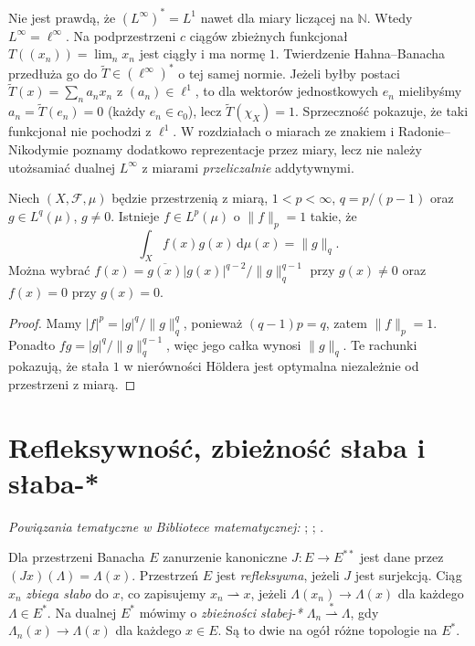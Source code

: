 \begin{uwaga}
Nie jest prawdą, że $(L^\infty)^*=L^1$ nawet dla
miary liczącej na $\mathbb N$. Wtedy $L^\infty=\ell^\infty$.
Na podprzestrzeni $c$ ciągów zbieżnych funkcjonał
$T((x_n))=\lim_nx_n$ jest ciągły i ma normę $1$.
Twierdzenie Hahna--Banacha przedłuża go do
$\widetilde T\in(\ell^\infty)^*$ o tej samej normie.
Jeżeli byłby postaci $\widetilde T(x)=\sum_n a_nx_n$
z $(a_n)\in\ell^1$, to dla wektorów jednostkowych $e_n$
mielibyśmy $a_n=\widetilde T(e_n)=0$ (każdy $e_n\in c_0$),
lecz $\widetilde T(\chi_X)=1$. Sprzeczność pokazuje,
że taki funkcjonał nie pochodzi z $\ell^1$.
W rozdziałach o miarach ze znakiem i Radonie--Nikodymie
poznamy dodatkowo reprezentacje przez miary, lecz nie
należy utożsamiać dualnej $L^\infty$ z miarami
\emph{przeliczalnie} addytywnymi.
\end{uwaga}

\begin{wniosek}
\label{cor:holder-sharp-15}
Niech $(X,\mathcal F,\mu)$ będzie przestrzenią z miarą,
$1<p<\infty$, $q=p/(p-1)$ oraz
$g\in L^q(\mu)$, $g\neq0$. Istnieje
$f\in L^p(\mu)$ o $\|f\|_p=1$ takie, że
\[
\int_X f(x)g(x)\,\mathrm d\mu(x)=\|g\|_q.
\]
Można wybrać
$f(x)=\overline{g(x)}|g(x)|^{q-2}/\|g\|_q^{q-1}$
przy $g(x)\neq0$ oraz $f(x)=0$ przy $g(x)=0$.
\end{wniosek}
\begin{proof}
Mamy $|f|^p=|g|^q/\|g\|_q^q$,
ponieważ $(q-1)p=q$, zatem $\|f\|_p=1$.
Ponadto $fg=|g|^q/\|g\|_q^{q-1}$, więc
jego całka wynosi $\|g\|_q$. Te rachunki
pokazują, że stała $1$ w nierówności Höldera
jest optymalna niezależnie od przestrzeni z miarą.
\end{proof}

\section{Refleksywność, zbieżność słaba i słaba-*}

\noindent\emph{Powiązania tematyczne w Bibliotece matematycznej:} ; ; .

\begin{definicja}
\label{def:weak-lp-15}
Dla przestrzeni Banacha $E$ zanurzenie kanoniczne
$J:E\to E^{**}$ jest dane przez $(Jx)(\Lambda)=\Lambda(x)$.
Przestrzeń $E$ jest \emph{refleksywna}, jeżeli $J$ jest
surjekcją. Ciąg $x_n$ \emph{zbiega słabo} do $x$,
co zapisujemy $x_n\rightharpoonup x$, jeżeli
$\Lambda(x_n)\to\Lambda(x)$ dla każdego $\Lambda\in E^*$.
Na dualnej $E^*$ mówimy o \emph{zbieżności słabej-*}
$\Lambda_n\overset{*}{\rightharpoonup}\Lambda$,
gdy $\Lambda_n(x)\to\Lambda(x)$ dla każdego $x\in E$.
Są to dwie na ogół różne topologie na $E^*$.
\end{definicja}


